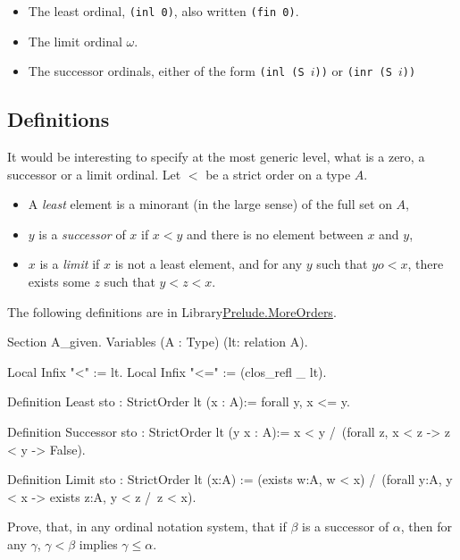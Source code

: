 \begin{itemize}
\item The least ordinal, \texttt{(inl 0)}, also written \texttt{(fin 0)}.
\item The limit ordinal $\omega$.
\item The successor ordinals, either of the form \texttt{(inl (S $i$))} or \texttt{(inr (S $i$))}
\end{itemize}

\subsection{Definitions}
It would be interesting to specify at the most generic level, what is a zero, a successor or a limit ordinal. Let $<$ be a strict order on a type $A$.

\begin{itemize}
\item A \emph{least} element is a minorant (in the large sense) of the full set  on $A$,
\item $y$ is a \emph{successor} of $x$ if $x<y$ and there is no element between $x$ and $y$,
\item $x$ is a \emph{limit} if $x$ is not a least element, and for any $y$ such that $yo<x$,
 there exists some $z$ such that $y<z<x$.
\end{itemize}


The following definitions are in Library\href{../src/html/hydras.Prelude.MoreOrders.html}{Prelude.MoreOrders}.

\begin{Coqsrc}
Section A_given.
  Variables (A : Type)  (lt: relation A).
  
Local Infix "<" := lt.
Local Infix "<=" := (clos_refl _ lt).

Definition Least {sto : StrictOrder lt} (x : A):=
  forall y,  x <= y.

Definition Successor {sto : StrictOrder lt} (y x : A):=
  x < y /\ (forall z,  x < z ->  z <  y -> False).

Definition Limit {sto : StrictOrder lt}  (x:A)  :=
  (exists w:A,  w < x) /\
  (forall y:A, y < x -> exists z:A, y < z /\ z < x).
\end{Coqsrc}

\begin{exercise}
Prove, that, in any ordinal notation system, that if $\beta$ is a successor of $\alpha$,
then for any $\gamma$, $\gamma<\beta$ implies 
$\gamma\leq\alpha$.
\end{exercise}




